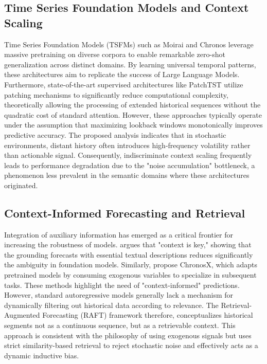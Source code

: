 \documentclass{article} %
\begin{document}
\subsection{Time Series Foundation Models and Context Scaling}
Time Series Foundation Models (TSFMs) such as Moirai and Chronos leverage massive pretraining on diverse corpora to enable remarkable zero-shot generalization across distinct domains. By learning universal temporal patterns, these architectures aim to replicate the success of Large Language Models. Furthermore, state-of-the-art supervised architectures like PatchTST \citep{nie2023time} utilize patching mechanisms to significantly reduce computational complexity, theoretically allowing the processing of extended historical sequences without the quadratic cost of standard attention. However, these approaches typically operate under the assumption that maximizing lookback windows monotonically improves predictive accuracy. The proposed analysis indicates that in stochastic environments, distant history often introduces high-frequency volatility rather than actionable signal. Consequently, indiscriminate context scaling frequently leads to performance degradation due to the "noise accumulation" bottleneck, a phenomenon less prevalent in the semantic domains where these architectures originated.

\subsection{Context-Informed Forecasting and Retrieval}
Integration of auxiliary information has emerged as a critical frontier for increasing the robustness of models. \cite{williams2024context} argues that "context is key," showing that the grounding forecasts with essential textual descriptions reduces significantly the ambiguity in foundation models. Similarly, \cite{arango2025chronosx} propose ChronosX, which adapts pretrained models by consuming exogenous variables to specialize in subsequent tasks. These methods highlight the need of "context-informed" predictions. However, standard autoregressive models generally lack a mechanism for dynamically filtering out historical data according to relevance. The Retrieval-Augmented Forecasting (RAFT) framework therefore, conceptualizes historical segments not as a continuous sequence, but as a retrievable context. This approach is consistent with the philosophy of using exogenous signals but uses strict similarity-based retrieval to reject stochastic noise and effectively acts as a dynamic inductive bias.
\end{document}
